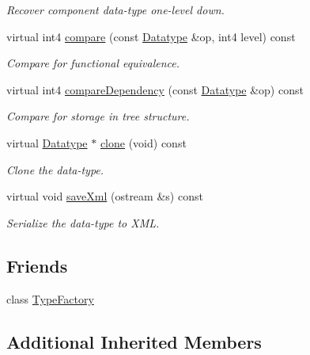 \begin{DoxyCompactItemize}
\begin{DoxyCompactList}\small\item\em Recover component data-\/type one-\/level down. \end{DoxyCompactList}\item 
virtual int4 \mbox{\hyperlink{class_type_spacebase_a1ec8296bec1fe983feba0dff1cd78b41}{compare}} (const \mbox{\hyperlink{class_datatype}{Datatype}} \&op, int4 level) const
\begin{DoxyCompactList}\small\item\em Compare for functional equivalence. \end{DoxyCompactList}\item 
virtual int4 \mbox{\hyperlink{class_type_spacebase_ae0bea6eed65dda9a50999bf664c70c3d}{compare\+Dependency}} (const \mbox{\hyperlink{class_datatype}{Datatype}} \&op) const
\begin{DoxyCompactList}\small\item\em Compare for storage in tree structure. \end{DoxyCompactList}\item 
virtual \mbox{\hyperlink{class_datatype}{Datatype}} $\ast$ \mbox{\hyperlink{class_type_spacebase_aefc6e8e08e15b87be40e987a916e85ec}{clone}} (void) const
\begin{DoxyCompactList}\small\item\em Clone the data-\/type. \end{DoxyCompactList}\item 
virtual void \mbox{\hyperlink{class_type_spacebase_a6540d83aa3ef2daf7bddeba9a0552c8f}{save\+Xml}} (ostream \&s) const
\begin{DoxyCompactList}\small\item\em Serialize the data-\/type to X\+ML. \end{DoxyCompactList}\end{DoxyCompactItemize}
\subsection*{Friends}
\begin{DoxyCompactItemize}
\item 
class \mbox{\hyperlink{class_type_spacebase_ac8c1945d0a63785e78b3e09a13226ed6}{Type\+Factory}}
\end{DoxyCompactItemize}
\subsection*{Additional Inherited Members}


